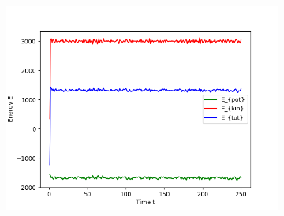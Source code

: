 \begin{figure}[ht]
\begin{subfigure}{0.3\textwidth}
\includegraphics[width=\textwidth]{../dat/Energies_T2d0.png}
\end{subfigure}


\end{figure}
